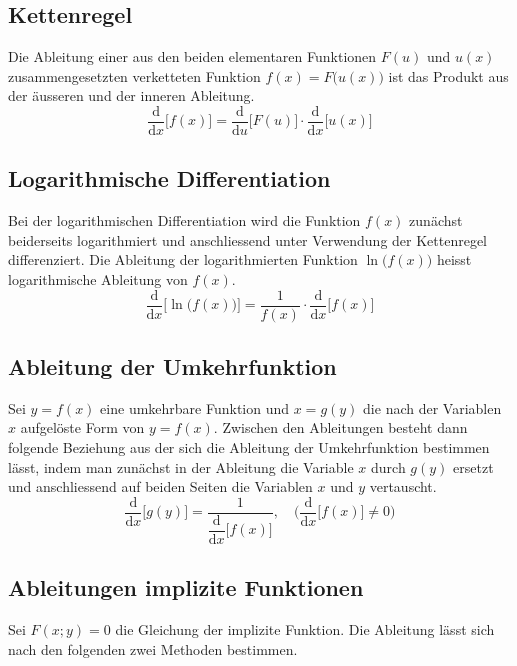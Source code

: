 \subsection{Kettenregel}
Die Ableitung einer aus den beiden elementaren Funktionen $F\left(u\right)$ und $u\left(x\right)$ zusammengesetzten verketteten Funktion $f\left(x\right)=F\Big(u\left(x\right)\Big)$ ist das Produkt aus der äusseren und der inneren Ableitung.
\begin{equation}
\boxed{\dfrac{\text{d}}{\text{d}x}\Big[f\left(x\right)\Big]=\dfrac{\text{d}}{\text{d}u}\Big[F\left(u\right)\Big]\cdot \dfrac{\text{d}}{\text{d}x}\Big[u\left(x\right)\Big]}
\end{equation}
\subsection{Logarithmische Differentiation}
Bei der logarithmischen Differentiation wird die Funktion $f\left(x\right)$ zunächst beiderseits logarithmiert und anschliessend unter Verwendung der Kettenregel differenziert. Die Ableitung der logarithmierten Funktion $\ln\Big(f\left(x\right)\Big)$ heisst logarithmische Ableitung von $f\left(x\right)$.
\begin{equation}
\boxed{\dfrac{\text{d}}{\text{d}x}\Big[\ln\Big(f\left(x\right)\Big)\Big]=\dfrac{1}{f\left(x\right)}\cdot \dfrac{\text{d}}{\text{d}x}\Big[f\left(x\right)\Big]}
\end{equation}
\subsection{Ableitung der Umkehrfunktion}
Sei $y=f\left(x\right)$ eine umkehrbare Funktion und $x=g\left(y\right)$ die nach der Variablen $x$ aufgelöste Form von $y=f\left(x\right)$. Zwischen den Ableitungen besteht dann folgende Beziehung aus der sich die Ableitung der Umkehrfunktion bestimmen lässt, indem man zunächst in der Ableitung die Variable $x$ durch $g\left(y\right)$ ersetzt und anschliessend auf beiden Seiten die Variablen $x$ und $y$ vertauscht.
\begin{equation}
\boxed{\dfrac{\text{d}}{\text{d}x}\Big[g\left(y\right)\Big]=\dfrac{1}{\dfrac{\text{d}}{\text{d}x}\Big[f\left(x\right)\Big]},\quad \Big(\dfrac{\text{d}}{\text{d}x}\Big[f\left(x\right)\Big]\neq 0\Big)}
\end{equation}
\subsection{Ableitungen implizite Funktionen}
Sei $F\left(x;y\right)=0$ die Gleichung der implizite Funktion. Die Ableitung lässt sich nach den folgenden zwei Methoden bestimmen.
